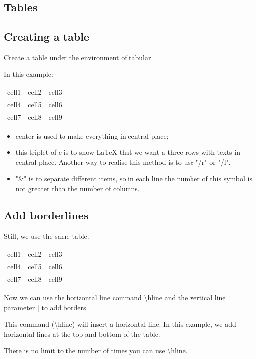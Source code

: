 \documentclass[12pt, letterpaper]{article}
\begin{document}
\begin{spacing}{1.3}
\section{Tables}
\subsection{Creating a table}
Create a table under the environment of tabular.

In this example:
\begin{center}
\begin{tabular}{ c c c }
 cell1 & cell2 & cell3 \\
 cell4 & cell5 & cell6 \\
 cell7 & cell8 & cell9
\end{tabular}
\end{center}

\begin{itemize}
    \item center is used to make everything in central place;
    \item this triplet of c is to show LaTeX that we want a three rows with texts in central place. Another way to realise this method is to use "/r" or "/l".
    \item "\&" is to separate different items, so in each line the number of this symbol is not greater than the number of columns.
\end{itemize}
\subsection{Add borderlines}
Still, we use the same table.
\begin{center}
\begin{tabular}{c c c}
     cell1 & cell2 & cell3 \\
     cell4 & cell5 & cell6 \\ 
     cell7 & cell8 & cell9 \\ 
\end{tabular}
\end{center}

Now we can use the horizontal line command \textbackslash hline and the vertical line parameter | to add borders.

This command (\textbackslash hline) will insert a horizontal line. In this example, we add horizontal lines at the top and bottom of the table. 

There is no limit to the number of times you can use \textbackslash hline.


\end{spacing}
\end{document}
